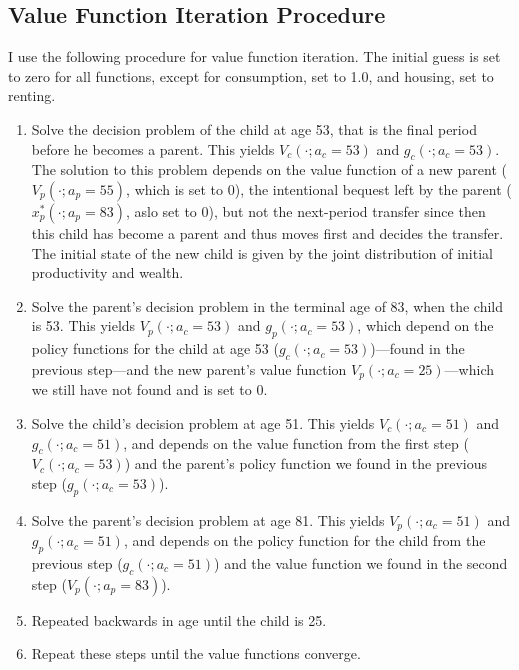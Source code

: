 \documentclass[12pt]{article}
\begin{document}
\subsection{Value Function Iteration Procedure}
I use the following procedure for value function iteration. The initial guess is set to zero for all functions, except for consumption, set to 1.0, and housing, set to renting.
\begin{enumerate}
    \item Solve the decision problem of the child at age 53, that is the final period before he becomes a parent. This yields $V_c(\cdot;a_c=53)$ and $g_c(\cdot;a_c=53)$. The solution to this problem depends on the value function of a new parent ($V_p(\cdot;a_p=55)$, which is set to 0), the intentional bequest left by the parent ($x_p^*(\cdot;a_p=83)$, aslo set to 0), but not the next-period transfer since then this child has become a parent and thus moves first and decides the transfer. The initial state of the new child is given by the joint distribution of initial productivity and wealth.
    \item Solve the parent's decision problem in the terminal age of 83, when the child is 53. This yields $V_p(\cdot;a_c=53)$ and $g_p(\cdot;a_c=53)$, which depend on the policy functions for the child at age 53 ($g_c(\cdot;a_c=53)$)---found in the previous step---and the new parent's value function $V_p(\cdot;a_c=25)$---which we still have not found and is set to 0.
    \item Solve the child's decision problem at age 51. This yields $V_c(\cdot;a_c=51)$ and $g_c(\cdot;a_c=51)$, and depends on the value function from the first step ($V_c(\cdot;a_c=53)$) and the parent's policy function we found in the previous step ($g_p(\cdot;a_c=53)$).
    \item Solve the parent's decision problem at age 81. This yields $V_p(\cdot;a_c=51)$ and $g_p(\cdot;a_c=51)$, and depends on the policy function for the child from the previous step ($g_c(\cdot;a_c=51)$) and the value function we found in the second step ($V_p(\cdot;a_p=83)$).
    \item Repeated backwards in age until the child is 25.
    \item Repeat these steps until the value functions converge.
\end{enumerate}
\end{document}
